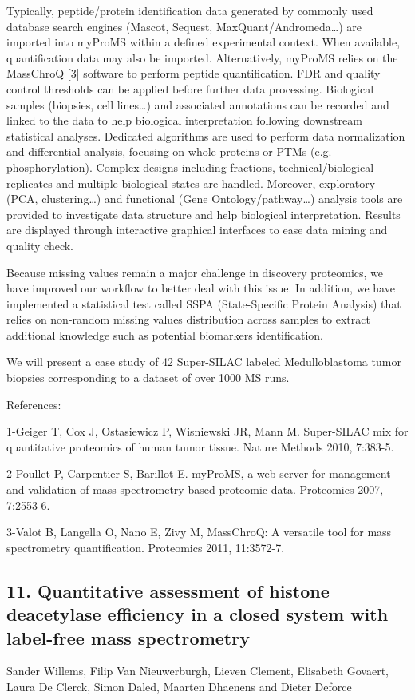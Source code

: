 Typically, peptide/protein identification data generated by commonly used database search engines (Mascot, Sequest, MaxQuant/Andromeda…) are imported into myProMS within a defined experimental context. When available, quantification data may also be imported. Alternatively, myProMS relies on the MassChroQ [3] software to perform peptide quantification. FDR and quality control thresholds can be applied before further data processing. Biological samples (biopsies, cell lines…) and associated annotations can be recorded and linked to the data to help biological interpretation following downstream statistical analyses. Dedicated algorithms are used to perform data normalization and differential analysis, focusing on whole proteins or PTMs (e.g. phosphorylation). Complex designs including fractions, technical/biological replicates and multiple biological states are handled. Moreover, exploratory (PCA, clustering…) and functional (Gene Ontology/pathway…) analysis tools are provided to investigate data structure and help biological interpretation. Results are displayed through interactive graphical interfaces to ease data mining and quality check.

Because missing values remain a major challenge in discovery proteomics, we have improved our workflow to better deal with this issue. In addition, we have implemented a statistical test called SSPA (State-Specific Protein Analysis) that relies on non-random missing values distribution across samples to extract additional knowledge such as potential biomarkers identification.

We will present a case study of 42 Super-SILAC labeled Medulloblastoma tumor biopsies corresponding to a dataset of over 1000 MS runs.

References:

1-Geiger T, Cox J, Ostasiewicz P, Wisniewski JR, Mann M. Super-SILAC mix for quantitative proteomics of human tumor tissue. Nature Methods 2010, 7:383-5.

2-Poullet P, Carpentier S, Barillot E. myProMS, a web server for management and validation of mass spectrometry-based proteomic data. Proteomics 2007, 7:2553-6.

3-Valot B, Langella O, Nano E, Zivy M, MassChroQ: A versatile tool for mass spectrometry quantification. Proteomics 2011, 11:3572-7.

\subsection*{\color{eubicRed} 11. Quantitative assessment of histone deacetylase efficiency in a closed system with label-free mass spectrometry}
{\color{eubicGray}Sander Willems, Filip Van Nieuwerburgh, Lieven Clement, Elisabeth Govaert, Laura De Clerck, Simon Daled, Maarten Dhaenens and Dieter Deforce}

